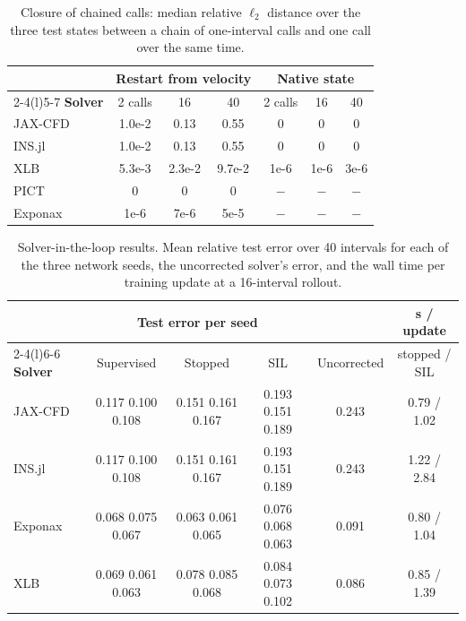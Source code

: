 \begin{table}[h]
  \centering\small
  \caption{Closure of chained calls: median relative $\ell_2$ distance over the
    three test states between a chain of one-interval calls and one call over
    the same time.}
  \label{tab:app:sil-closure}
  \begin{tabular}{@{}lcccccc@{}}
    \toprule
    & \multicolumn{3}{c}{\textbf{Restart from velocity}} & \multicolumn{3}{c}{\textbf{Native state}} \\
    \cmidrule(lr){2-4}\cmidrule(l){5-7}
    \textbf{Solver} & 2 calls & 16 & 40 & 2 calls & 16 & 40 \\
    \midrule
    JAX-CFD & 1.0e-2 & 0.13 & 0.55 & 0 & 0 & 0 \\
    INS.jl & 1.0e-2 & 0.13 & 0.55 & 0 & 0 & 0 \\
    XLB & 5.3e-3 & 2.3e-2 & 9.7e-2 & 1e-6 & 1e-6 & 3e-6 \\
    PICT & 0 & 0 & 0 & $-$ & $-$ & $-$ \\
    Exponax & 1e-6 & 7e-6 & 5e-5 & $-$ & $-$ & $-$ \\
    \bottomrule
  \end{tabular}
\end{table}

\begin{table}[h]
  \centering\small
  \caption{Solver-in-the-loop results. Mean relative test error over 40
    intervals for each of the three network seeds, the uncorrected solver's
    error, and the wall time per training update at a 16-interval rollout.}
  \label{tab:app:sil}
  \setlength{\tabcolsep}{4pt}
  \begin{tabular}{@{}lccccc@{}}
    \toprule
    & \multicolumn{3}{c}{\textbf{Test error per seed}} & & \textbf{s / update} \\
    \cmidrule(lr){2-4}\cmidrule(l){6-6}
    \textbf{Solver} & Supervised & Stopped & SIL & Uncorrected & stopped / SIL \\
    \midrule
    JAX-CFD & 0.117 0.100 0.108 & 0.151 0.161 0.167 & 0.193 0.151 0.189 & 0.243 & 0.79 / 1.02 \\
    INS.jl & 0.117 0.100 0.108 & 0.151 0.161 0.167 & 0.193 0.151 0.189 & 0.243 & 1.22 / 2.84 \\
    Exponax & 0.068 0.075 0.067 & 0.063 0.061 0.065 & 0.076 0.068 0.063 & 0.091 & 0.80 / 1.04 \\
    XLB & 0.069 0.061 0.063 & 0.078 0.085 0.068 & 0.084 0.073 0.102 & 0.086 & 0.85 / 1.39 \\
    \bottomrule
  \end{tabular}
\end{table}

